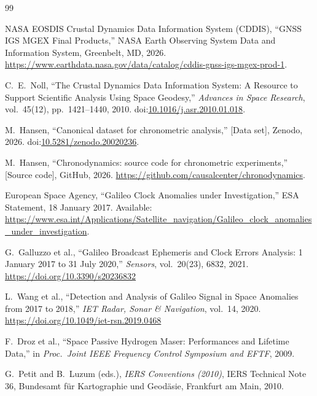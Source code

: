 \documentclass[11pt,a4paper]{article}
\begin{document}
\begin{thebibliography}{99}

NASA EOSDIS Crustal Dynamics Data Information System (CDDIS), ``GNSS IGS MGEX Final Products,'' NASA Earth Observing System Data and Information System, Greenbelt, MD, 2026. \url{https://www.earthdata.nasa.gov/data/catalog/cddis-gnss-igs-mgex-prod-1}.

C.~E.~Noll, ``The Crustal Dynamics Data Information System: A Resource to Support Scientific Analysis Using Space Geodesy,'' \emph{Advances in Space Research}, vol.~45(12), pp.~1421--1440, 2010. doi:\href{https://doi.org/10.1016/j.asr.2010.01.018}{10.1016/j.asr.2010.01.018}.

M.~Hansen, ``Canonical dataset for chronometric analysis,'' [Data set], Zenodo, 2026. doi:\href{https://doi.org/10.5281/zenodo.20020236}{10.5281/zenodo.20020236}.

M.~Hansen, ``Chronodynamics: source code for chronometric experiments,'' [Source code], GitHub, 2026. \url{https://github.com/causalcenter/chronodynamics}.

European Space Agency, ``Galileo Clock Anomalies under Investigation,'' ESA Statement, 18 January 2017. Available: \url{https://www.esa.int/Applications/Satellite_navigation/Galileo_clock_anomalies_under_investigation}.

G.~Galluzzo et al., ``Galileo Broadcast Ephemeris and Clock Errors Analysis: 1 January 2017 to 31 July 2020,'' \emph{Sensors}, vol.~20(23), 6832, 2021. \url{https://doi.org/10.3390/s20236832}

L.~Wang et al., ``Detection and Analysis of Galileo Signal in Space Anomalies from 2017 to 2018,'' \emph{IET Radar, Sonar \& Navigation}, vol.~14, 2020. \url{https://doi.org/10.1049/iet-rsn.2019.0468}

F.~Droz et al., ``Space Passive Hydrogen Maser: Performances and Lifetime Data,'' in \emph{Proc.\ Joint IEEE Frequency Control Symposium and EFTF}, 2009.

G.~Petit and B.~Luzum (eds.), \emph{IERS Conventions (2010)}, IERS Technical Note 36, Bundesamt f\"ur Kartographie und Geod\"asie, Frankfurt am Main, 2010.

\end{thebibliography}
\end{document}
